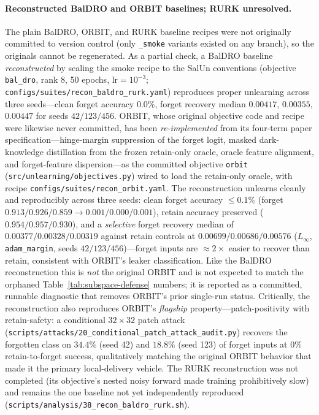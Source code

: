 \documentclass[11pt]{article}
\begin{document}
\paragraph{Reconstructed BalDRO and ORBIT baselines; RURK unresolved.} The plain BalDRO, ORBIT, and RURK baseline recipes were not originally committed to version control (only \texttt{\_smoke} variants existed on any branch), so the originals cannot be regenerated. As a partial check, a BalDRO baseline \emph{reconstructed} by scaling the smoke recipe to the SalUn conventions (objective \texttt{bal\_dro}, rank 8, 50 epochs, $\mathrm{lr}=10^{-3}$; \texttt{configs/suites/recon\_baldro\_rurk.yaml}) reproduces proper unlearning across three seeds---clean forget accuracy $0.0\%$, forget recovery median $0.00417$, $0.00355$, $0.00447$ for seeds $42/123/456$. ORBIT, whose original objective code and recipe were likewise never committed, has been \emph{re-implemented} from its four-term paper specification---hinge-margin suppression of the forget logit, masked dark-knowledge distillation from the frozen retain-only oracle, oracle feature alignment, and forget-feature dispersion---as the committed objective \texttt{orbit} (\texttt{src/unlearning/objectives.py}) wired to load the retain-only oracle, with recipe \texttt{configs/suites/recon\_orbit.yaml}. The reconstruction unlearns cleanly and reproducibly across three seeds: clean forget accuracy $\le\!0.1\%$ (forget $0.913/0.926/0.859 \to 0.001/0.000/0.001$), retain accuracy preserved ($0.954/0.957/0.930$), and a \emph{selective} forget recovery median of $0.00377/0.00328/0.00319$ against retain controls at $0.00699/0.00686/0.00576$ ($L_\infty$, \texttt{adam\_margin}, seeds $42/123/456$)---forget inputs are $\approx\!2\times$ easier to recover than retain, consistent with ORBIT's leaker classification. Like the BalDRO reconstruction this is \emph{not} the original ORBIT and is not expected to match the orphaned Table~\ref{tab:subspace-defense} numbers; it is reported as a committed, runnable diagnostic that removes ORBIT's prior single-run status. Critically, the reconstruction also reproduces ORBIT's \emph{flagship} property---patch-positivity with retain-safety: a conditional $32\times32$ patch attack (\texttt{scripts/attacks/20\_conditional\_patch\_attack\_audit.py}) recovers the forgotten class on $34.4\%$ (seed 42) and $18.8\%$ (seed 123) of forget inputs at $0\%$ retain-to-forget success, qualitatively matching the original ORBIT behavior that made it the primary local-delivery vehicle. The RURK reconstruction was not completed (its objective's nested noisy forward made training prohibitively slow) and remains the one baseline not yet independently reproduced (\texttt{scripts/analysis/38\_recon\_baldro\_rurk.sh}).
\end{document}
